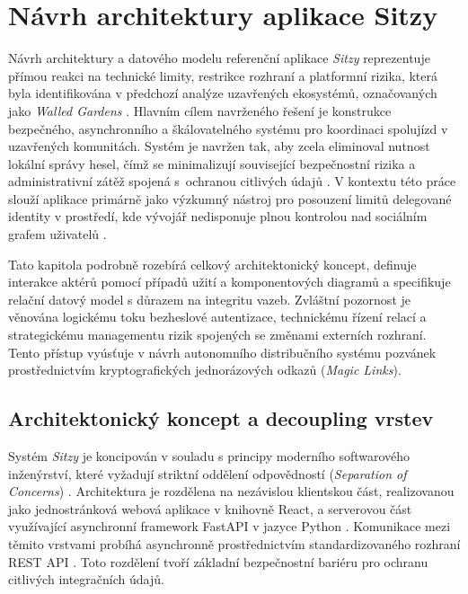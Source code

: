 \documentclass[male,czech,api_bc]{kitheses}
\begin{document}
\chapter{Návrh architektury aplikace Sitzy}
\label{chap:navrh_architektury}

Návrh architektury a datového modelu referenční aplikace \textit{Sitzy} reprezentuje přímou reakci na technické limity, restrikce rozhraní a platformní rizika, která byla identifikována v předchozí analýze uzavřených ekosystémů, označovaných jako \textit{Walled Gardens} \cite{Marro2025,DeNardis2015}. Hlavním cílem navrženého řešení je konstrukce bezpečného, asynchronního a škálovatelného systému pro koordinaci spolujízd v uzavřených komunitách. Systém je navržen tak, aby zcela eliminoval nutnost lokální správy hesel, čímž se minimalizují související bezpečnostní rizika a administrativní zátěž spojená s~ochranou citlivých údajů \cite{Naryama2026525,Cavoukian2010}. V kontextu této práce slouží aplikace primárně jako výzkumný nástroj pro posouzení limitů delegované identity v prostředí, kde vývojář nedisponuje plnou kontrolou nad sociálním grafem uživatelů \cite{Mudassir20241030,Sommerville2011}.

Tato kapitola podrobně rozebírá celkový architektonický koncept, definuje interakce aktérů pomocí případů užití a komponentových diagramů a specifikuje relační datový model s důrazem na integritu vazeb. Zvláštní pozornost je věnována logickému toku bezheslové autentizace, technickému řízení relací a strategickému managementu rizik spojených se změnami externích rozhraní. Tento přístup vyúsťuje v návrh autonomního distribučního systému pozvánek prostřednictvím kryptografických jednorázových odkazů (\textit{Magic Links}).

\section{Architektonický koncept a decoupling vrstev}

Systém \textit{Sitzy} je koncipován v souladu s principy moderního softwarového inženýrství, které vyžadují striktní oddělení odpovědností (\textit{Separation of Concerns}) \cite{Fielding2000,Sommerville2011}. Architektura je rozdělena na nezávislou klientskou část, realizovanou jako jednostránková webová aplikace v knihovně React, a serverovou část využívající asynchronní framework FastAPI v jazyce Python \cite{Mudassir20241030,React20251023}. Komunikace mezi těmito vrstvami probíhá asynchronně prostřednictvím standardizovaného rozhraní REST API \cite{Fielding2000}. Toto rozdělení tvoří základní bezpečnostní bariéru pro ochranu citlivých integračních údajů.
\end{document}

